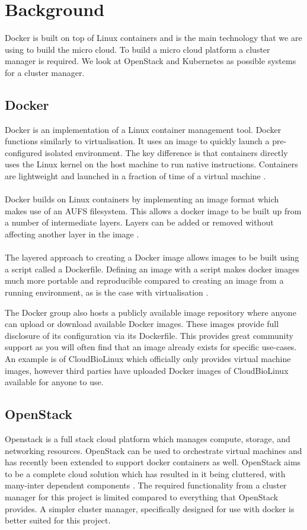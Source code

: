 \documentclass{sig-alternate-05-2015}
\begin{document}
\section{Background}
Docker is built on top of Linux containers and is the main technology that we are using to build the micro cloud. To build a micro cloud platform a cluster manager is required. We look at OpenStack and Kubernetes as possible systems for a cluster manager.


\subsection{Docker}
Docker is an implementation of a Linux container management tool. Docker functions similarly to virtualisation. It uses an image to quickly launch a pre-configured isolated environment. The key difference is that containers directly uses the Linux kernel on the host machine to run native instructions. Containers are lightweight and launched in a fraction of time of a virtual machine \cite{joy2015performance}. 
\\\\
Docker builds on Linux containers by implementing an image format which makes use of an AUFS filesystem. This allows a docker image to be built up from a number of intermediate layers. Layers can be added or removed without affecting another layer in the image \cite{boettiger2014introduction}.
\\\\
The layered approach to creating a Docker image allows images to be built using a script called a Dockerfile. Defining an image with a script makes docker images much more portable and reproducible compared to creating an image from a running environment, as is the case with virtualisation \cite{boettiger2014introduction}.

The Docker group also hosts a publicly available image repository where anyone can upload or download available Docker images. These images provide full disclosure of its configuration via its Dockerfile. This provides great community support as you will often find that an image already exists for specific use-cases. An example is of CloudBioLinux which officially only provides virtual machine images, however third parties have uploaded Docker images of CloudBioLinux available for anyone to use.

\subsection{OpenStack}
Openstack is a full stack cloud platform which manages compute, storage, and networking resources. OpenStack can be used to orchestrate virtual machines and has recently been extended to support docker containers as well. OpenStack aims to be a complete cloud solution which has resulted in it being cluttered, with many-inter dependent components \cite{affetti2015adock}. The required functionality  from a cluster manager for this project is limited compared to everything that OpenStack provides. A simpler cluster manager, specifically designed for use with docker is better suited for this project.
\end{document}
